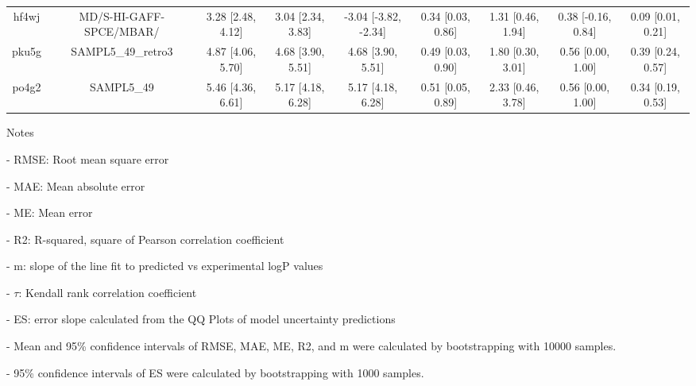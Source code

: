 \documentclass{article}
\begin{document}
\begin{center}
\begin{longtable}{|ccccccccc|}
 hf4wj &                            MD/S-HI-GAFF-SPCE/MBAR/ &  3.28 [2.48, 4.12] &  3.04 [2.34, 3.83] &  -3.04 [-3.82, -2.34] &  0.34 [0.03, 0.86] &    1.31 [0.46, 1.94] &   0.38 [-0.16, 0.84] &     0.09 [0.01, 0.21] \\
 pku5g &                                 SAMPL5\_49\_retro3 &  4.87 [4.06, 5.70] &  4.68 [3.90, 5.51] &     4.68 [3.90, 5.51] &  0.49 [0.03, 0.90] &    1.80 [0.30, 3.01] &    0.56 [0.00, 1.00] &     0.39 [0.24, 0.57] \\
 po4g2 &                                         SAMPL5\_49 &  5.46 [4.36, 6.61] &  5.17 [4.18, 6.28] &     5.17 [4.18, 6.28] &  0.51 [0.05, 0.89] &    2.33 [0.46, 3.78] &    0.56 [0.00, 1.00] &     0.34 [0.19, 0.53] \\
\end{longtable}
\end{center}

Notes

- RMSE: Root mean square error

- MAE: Mean absolute error

- ME: Mean error

- R2: R-squared, square of Pearson correlation coefficient

- m: slope of the line fit to predicted vs experimental logP values

- $\tau$:  Kendall rank correlation coefficient

- ES: error slope calculated from the QQ Plots of model uncertainty predictions

- Mean and 95\% confidence intervals of RMSE, MAE, ME, R2, and m were calculated by bootstrapping with 10000 samples.

- 95\% confidence intervals of ES were calculated by bootstrapping with 1000 samples.\end{document}
\end{document}
